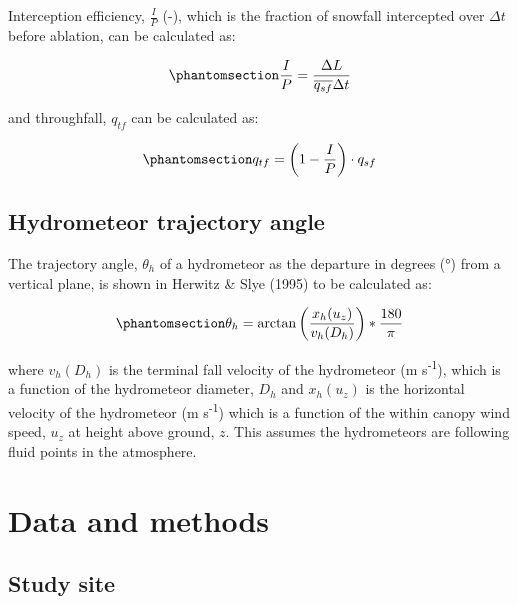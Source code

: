 \documentclass[
  letterpaper,
  DIV=11,
  numbers=noendperiod]{scrartcl}
\begin{document}
Interception efficiency, \(\frac{I}{P}\) (-), which is the fraction of
snowfall intercepted over \(\Delta t\) before ablation, can be
calculated as:

\begin{equation}\phantomsection\label{eq-ip}{
\frac{I}{P} = \frac{\Delta L}{\overline{q_{sf}} \Delta t}
}\end{equation}

and throughfall, \(q_{tf}\) can be calculated as:

\begin{equation}\phantomsection\label{eq-event-tf}{
q_{tf} = \left(1 - \frac{I}{P} \right) \cdot q_{sf}
}\end{equation}

\subsection{Hydrometeor trajectory
angle}\label{hydrometeor-trajectory-angle}

The trajectory angle, \(\theta_h\) of a hydrometeor as the departure in
degrees (°) from a vertical plane, is shown in Herwitz \& Slye (1995) to
be calculated as:

\begin{equation}\phantomsection\label{eq-ta}{
\theta_h = \arctan \left(\frac{x_h(u_z)}{v_h(D_h)}\right)*\frac{180}{\pi}
}\end{equation}

where \(v_h(D_h)\) is the terminal fall velocity of the hydrometeor (m
s\textsuperscript{-1}), which is a function of the hydrometeor diameter,
\(D_h\) and \(x_h(u_z)\) is the horizontal velocity of the hydrometeor
(m s\textsuperscript{-1}) which is a function of the within canopy wind
speed, \(u_z\) at height above ground, \(z\). This assumes the
hydrometeors are following fluid points in the atmosphere.

\section{Data and methods}\label{data-and-methods}

\subsection{Study site}\label{study-site}
\end{document}
